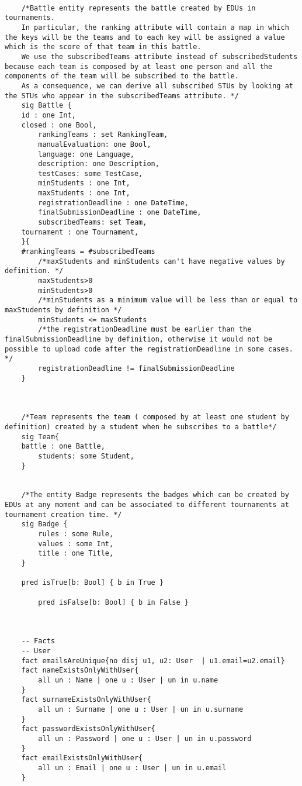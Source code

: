 \begin{lstlisting}[language=Alloy,  label={lst:alloycode}, basicstyle=\fontfamily{Roboto}\selectfont\ttfamily]
    
    /*Battle entity represents the battle created by EDUs in tournaments.
    In particular, the ranking attribute will contain a map in which the keys will be the teams and to each key will be assigned a value which is the score of that team in this battle.
    We use the subscribedTeams attribute instead of subscribedStudents because each team is composed by at least one person and all the components of the team will be subscribed to the battle. 
    As a consequence, we can derive all subscribed STUs by looking at the STUs who appear in the subscribedTeams attribute. */
    sig Battle {
	id : one Int,
	closed : one Bool,
        rankingTeams : set RankingTeam,
        manualEvaluation: one Bool,
        language: one Language,
        description: one Description,
        testCases: some TestCase,
        minStudents : one Int,
        maxStudents : one Int,
        registrationDeadline : one DateTime,
        finalSubmissionDeadline : one DateTime,
        subscribedTeams: set Team,
	tournament : one Tournament,
    }{
	#rankingTeams = #subscribedTeams
        /*maxStudents and minStudents can't have negative values by definition. */
        maxStudents>0
        minStudents>0 
        /*minStudents as a minimum value will be less than or equal to maxStudents by definition */
        minStudents <= maxStudents
        /*the registrationDeadline must be earlier than the finalSubmissionDeadline by definition, otherwise it would not be possible to upload code after the registrationDeadline in some cases. */
        registrationDeadline != finalSubmissionDeadline 
    }



    /*Team represents the team ( composed by at least one student by definition) created by a student when he subscribes to a battle*/
    sig Team{
	battle : one Battle,
        students: some Student,
    }


    /*The entity Badge represents the badges which can be created by EDUs at any moment and can be associated to different tournaments at tournament creation time. */
    sig Badge {
        rules : some Rule,
        values : some Int,
        title : one Title,
    }

	pred isTrue[b: Bool] { b in True }

        pred isFalse[b: Bool] { b in False }
        
    
        
	-- Facts
	-- User
	fact emailsAreUnique{no disj u1, u2: User  | u1.email=u2.email}
	fact nameExistsOnlyWithUser{
		all un : Name | one u : User | un in u.name
	}
	fact surnameExistsOnlyWithUser{
		all un : Surname | one u : User | un in u.surname
	}
	fact passwordExistsOnlyWithUser{
		all un : Password | one u : User | un in u.password
	}
	fact emailExistsOnlyWithUser{
		all un : Email | one u : User | un in u.email
	}
	

\end{lstlisting}
